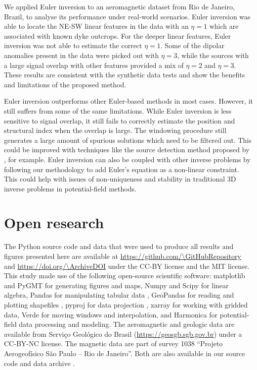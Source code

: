 We applied Euler inversion to an aeromagnetic dataset from Rio de Janeiro, Brazil, to analyse its performance under real-world scenarios.
Euler inversion was able to locate the NE-SW linear features in the data with an $\eta=1$ which are associated with known dyke outcrops.
For the deeper linear features, Euler inversion was not able to estimate the correct $\eta=1$.
Some of the dipolar anomalies present in the data were picked out with $\eta=3$, while the sources with a large signal overlap with other features provided a mix of $\eta=2$ and $\eta=3$.
These results are consistent with the synthetic data tests and show the benefits and limitations of the proposed method.

Euler inversion outperforms other Euler-based methods in most cases.
However, it still suffers from some of the same limitations.
While Euler inversion is less sensitive to signal overlap, it still fails to correctly estimate the position and structural index when the overlap is large.
The windowing procedure still generates a large amount of spurious solutions which need to be filtered out.
This could be improved with techniques like the source detection method proposed by \citet{Castro2020}, for example.
Euler inversion can also be coupled with other inverse problems by following our methodology to add Euler's equation as a non-linear constraint.
This could help with issues of non-uniqueness and stability in traditional 3D inverse problems in potential-field methods.

\section*{Open research}

The Python source code and data that were used to produce all results and
figures presented here are available at
\url{https://github.com/\GitHubRepository}
and \url{https://doi.org/\ArchiveDOI} \citep{figshare}
under the CC-BY license and the MIT license.
This study made use of the following open-source scientific software:
matplotlib \citep{matplotlib} and PyGMT \citep{pygmt} for generating figures and maps,
Numpy \citep{numpy} and Scipy \citep{scipy} for linear algebra,
Pandas for manipulating tabular data \citep{McKinney2010,pandas},
GeoPandas for reading and plotting shapefiles \citep{geopandas},
pyproj for data projection \citep{pyproj},
xarray \citep{xarray} for working with gridded data,
Verde \citep{verde} for moving windows and interpolation,
and Harmonica \citep{harmonica} for potential-field data processing and modeling.
The aeromagnetic and geologic data are available from Serviço Geológico do Brasil
(\url{https://geosgb.sgb.gov.br}) under a CC-BY-NC license.
The magnetic data are part of survey 1038 ``Projeto Aerogeofísico São Paulo -- Rio de Janeiro''.
Both are also available in our source code and data archive \citep{figshare}.


